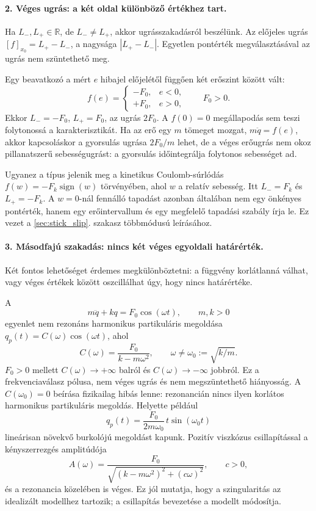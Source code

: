 \paragraph{2. Véges ugrás: a két oldal különböző értékhez tart.}
Ha $L_-,L_+\in\mathbb R$, de $L_-\neq L_+$, akkor ugrásszakadásról beszélünk. Az előjeles ugrás $[f]_{x_0}=L_+-L_-$, a nagysága $|L_+-L_-|$. Egyetlen pontérték megválasztásával az ugrás nem szüntethető meg.

 Egy beavatkozó a mért $e$ hibajel előjelétől függően két erőszint között vált:
\[
f(e)=\begin{cases}-F_0,&e<0,\\+F_0,&e>0,\end{cases}
\qquad F_0>0.
\]
Ekkor $L_-=-F_0$, $L_+=F_0$, az ugrás $2F_0$. A $f(0)=0$ megállapodás sem teszi folytonossá a karakterisztikát. Ha az erő egy $m$ tömeget mozgat, $m\ddot q=f(e)$, akkor kapcsoláskor a gyorsulás ugrása $2F_0/m$ lehet, de a véges erőugrás nem okoz pillanatszerű sebességugrást: a gyorsulás időintegrálja folytonos sebességet ad.

Ugyanez a típus jelenik meg a kinetikus Coulomb-súrlódás $f(w)=-F_k\operatorname{sign}(w)$ törvényében, ahol $w$ a relatív sebesség. Itt $L_-=F_k$ és $L_+=-F_k$. A $w=0$-nál fennálló tapadást azonban általában nem egy önkényes pontérték, hanem egy erőintervallum és egy megfelelő tapadási szabály írja le. Ez vezet a \ref{sec:stick_slip}. szakasz többmódusú leírásához.
\exampleend

\paragraph{3. Másodfajú szakadás: nincs két véges egyoldali határérték.}
Két fontos lehetőséget érdemes megkülönböztetni: a függvény korlátlanná válhat, vagy véges értékek között oszcillálhat úgy, hogy nincs határértéke.

 A
\[
m\ddot q+kq=F_0\cos(\omega t),\qquad m,k>0
\]
egyenlet nem rezonáns harmonikus partikuláris megoldása $q_p(t)=C(\omega)\cos(\omega t)$, ahol
\[
C(\omega)=\frac{F_0}{k-m\omega^2},\qquad
\omega\neq\omega_0:=\sqrt{k/m}.
\]
$F_0>0$ mellett $C(\omega)\to+\infty$ balról és $C(\omega)\to-\infty$ jobbról. Ez a frekvenciaválasz pólusa, nem véges ugrás és nem megszüntethető hiányosság. A $C(\omega_0)=0$ beírása fizikailag hibás lenne: rezonancián nincs ilyen korlátos harmonikus partikuláris megoldás. Helyette például
\[
q_p(t)=\frac{F_0}{2m\omega_0}\,t\sin(\omega_0t)
\]
lineárisan növekvő burkolójú megoldást kapunk. Pozitív viszkózus csillapítással a kényszerrezgés amplitúdója
\[
A(\omega)=\frac{F_0}{\sqrt{(k-m\omega^2)^2+(c\omega)^2}},\qquad c>0,
\]
és a rezonancia közelében is véges. Ez jól mutatja, hogy a szingularitás az idealizált modellhez tartozik; a csillapítás bevezetése a modellt módosítja.
\exampleend

